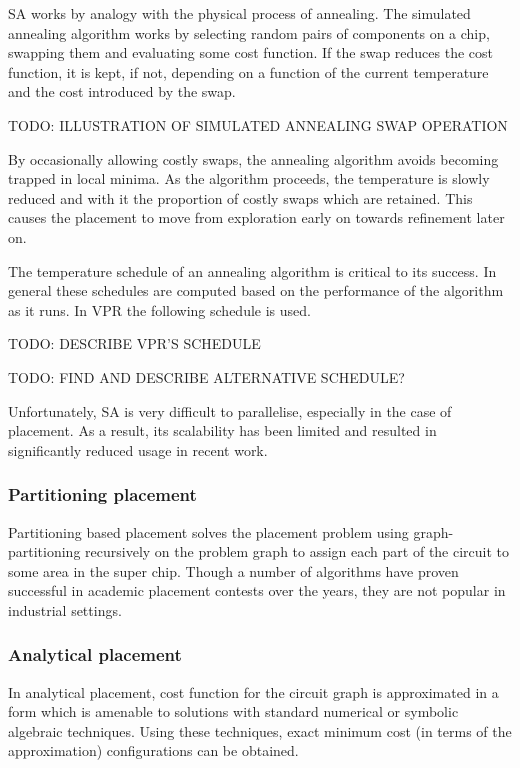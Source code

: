 				SA works by analogy with the physical process of annealing.
				The simulated annealing algorithm works by selecting random pairs of
				components on a chip, swapping them and evaluating some cost function.
				If the swap reduces the cost function, it is kept, if not, depending on
				a function of the current temperature and the cost introduced by the
				swap.
				
				TODO: ILLUSTRATION OF SIMULATED ANNEALING SWAP OPERATION
				
				By occasionally allowing costly swaps, the annealing algorithm avoids
				becoming trapped in local minima. As the algorithm proceeds, the
				temperature is slowly reduced and with it the proportion of costly
				swaps which are retained. This causes the placement to move from
				exploration early on towards refinement later on.
				
				The temperature schedule of an annealing algorithm is critical to its
				success. In general these schedules are computed based on the
				performance of the algorithm as it runs. In VPR the following schedule
				is used.
				
				TODO: DESCRIBE VPR'S SCHEDULE
				
				TODO: FIND AND DESCRIBE ALTERNATIVE SCHEDULE?
				
				Unfortunately, SA is very difficult to parallelise, especially in the
				case of placement. As a result, its scalability has been limited and
				resulted in significantly reduced usage in recent work.
			
			\subsubsection{Partitioning placement}
				
				Partitioning based placement solves the placement problem using
				graph-partitioning recursively on the problem graph to assign each part
				of the circuit to some area in the super chip. Though a number of
				algorithms have proven successful in academic placement contests over
				the years, they are not popular in industrial settings.
			
			\subsubsection{Analytical placement}
				
				In analytical placement, cost function for the circuit graph is
				approximated in a form which is amenable to solutions with standard
				numerical or symbolic algebraic techniques. Using these techniques,
				exact minimum cost (in terms of the approximation) configurations can
				be obtained.
				
